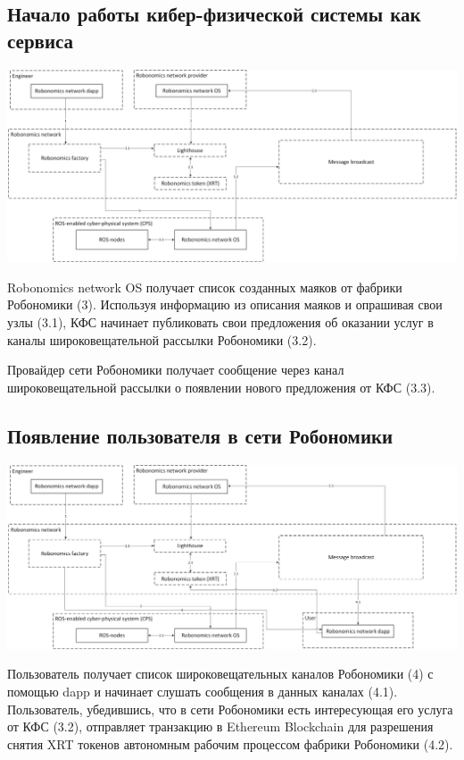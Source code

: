 \documentclass{article}
\begin{document}
\subsection{Начало работы кибер-физической системы как сервиса}

\includegraphics[width=1\textwidth]{step-by-step-3.png}

Robonomics network OS получает список созданных маяков от фабрики Робономики (3). Используя информацию из описания маяков и опрашивая свои узлы (3.1), КФС начинает публиковать свои предложения об оказании услуг в каналы широковещательной рассылки Робономики (3.2). 

Провайдер сети Робономики получает сообщение через канал широковещательной рассылки о появлении нового предложения от КФС (3.3).

\subsection{Появление пользователя в сети Робономики}

\includegraphics[width=1\textwidth]{step-by-step-4.png} 

Пользователь получает список широковещательных каналов Робономики (4) с помощью dapp и начинает слушать сообщения в данных каналах (4.1). Пользователь, убедившись, что в сети Робономики есть интересующая его услуга от КФС (3.2), отправляет транзакцию в Ethereum Blockchain для разрешения снятия XRT токенов автономным рабочим процессом фабрики Робономики (4.2).
\end{document}
